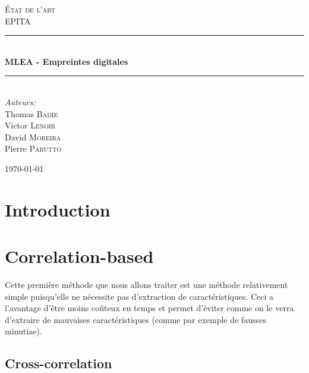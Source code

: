 \documentclass{report}
\newcommand{\HRule}{\rule{\linewidth}{0.5mm}}
\begin{document}
\begin{titlepage}

\begin{center}

\textsc{\LARGE \'Etat de l'art}\\[1.5cm]

\textsc{\Large EPITA}\\[0.5cm]

\HRule \\[0.4cm]
{ \huge \bfseries MLEA - Empreintes digitales}\\[0.4cm]

\HRule \\[1.5cm]

\large
\emph{Auteurs:}\\
Thomas \textsc{Badie}\\
Victor \textsc{Lenoir}\\
David \textsc{Moreira}\\
Pierre \textsc{Parutto}\\

\vfill

{\large \today}

\end{center}

\end{titlepage}
\newpage
\tableofcontents
\newpage

\chapter{Introduction}




\chapter{Correlation-based}

Cette première méthode que nous allons traiter est une méthode
relativement simple puisqu'elle ne nécessite pas d'extraction de
caractéristiques. Ceci a l'avantage d'être moins coûteux en temps et
permet d'éviter comme on le verra d'extraire de mauvaises
caractéristiques (comme par exemple de fausses minutiae).

\section{Cross-correlation}
\end{document}
